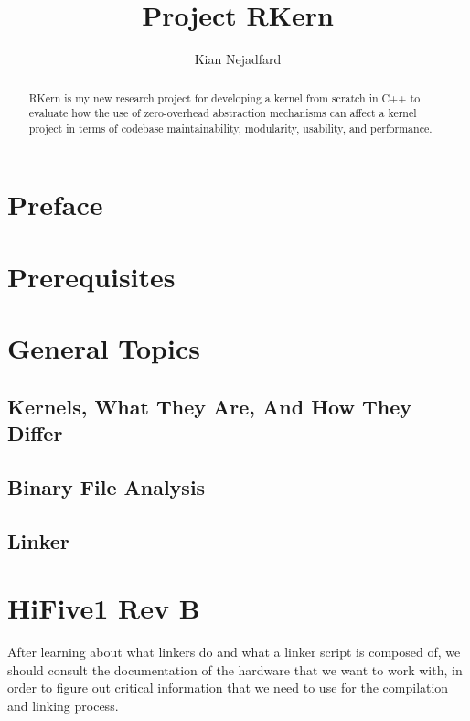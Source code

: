 \documentclass[a4paper,12pt,twoside]{report}
\title{Project RKern}
\author{Kian Nejadfard}
\begin{document}
    \maketitle

    \begin{abstract}
    	RKern is my new research project for developing a kernel from scratch in C++ to evaluate how the use of zero-overhead abstraction mechanisms can affect a kernel project in terms of codebase maintainability, modularity, usability, and performance.
    \end{abstract}

	\chapter{Preface}
        

    \chapter{Prerequisites}
        

    \chapter{General Topics}
        \section{Kernels, What They Are, And How They Differ}
            

        \section{Binary File Analysis}
            

        \section{Linker}
            

    \chapter{HiFive1 Rev B}
        After learning about what linkers do and what a linker script is composed of, we should consult the documentation of the hardware that we want to work with, in order to figure out critical information that we need to use for the compilation and linking process.
\end{document}
